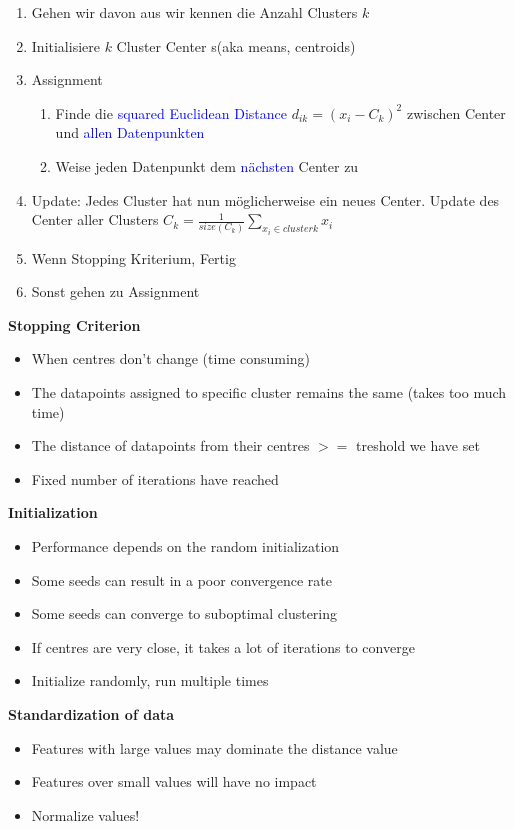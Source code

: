\begin{enumerate}
    \item Gehen wir davon aus wir kennen die Anzahl Clusters $k$
    \item Initialisiere $k$ Cluster Center s(aka means, centroids)
    \item Assignment
        \begin{enumerate}
            \item Finde die \textcolor{blue}{squared Euclidean Distance} $d_{ik} = (x_i - C_k)^2$ zwischen Center und \textcolor{blue}{allen Datenpunkten}
            \item Weise jeden Datenpunkt dem \textcolor{blue}{nächsten} Center zu
        \end{enumerate}
    \item Update: Jedes Cluster hat nun möglicherweise ein neues Center. Update des Center aller Clusters $C_k = \frac{1}{size(C_k)} \sum_{x_i \in cluster k} x_i$
    \item Wenn Stopping Kriterium, Fertig
    \item Sonst gehen zu Assignment
\end{enumerate}
\vspace{10pt}

\textbf{Stopping Criterion}
\begin{itemize}
    \item When centres don't change (time consuming)
    \item The datapoints assigned to specific cluster remains the same (takes too much time)
    \item The distance of datapoints from their centres $>=$ treshold we have set
    \item Fixed number of iterations have reached
\end{itemize}
\vspace{10pt}
\textbf{Initialization}
\begin{itemize}
    \item Performance depends on the random initialization
    \item Some seeds can result in a poor convergence rate
    \item Some seeds can converge to suboptimal clustering
    \item If centres are very close, it takes a lot of iterations to converge
    \item Initialize randomly, run multiple times
\end{itemize}
\vspace{10pt}
\textbf{Standardization of data}
\begin{itemize}
    \item Features with large values may dominate the distance value
    \item Features over small values will have no impact
    \item Normalize values!
\end{itemize}

